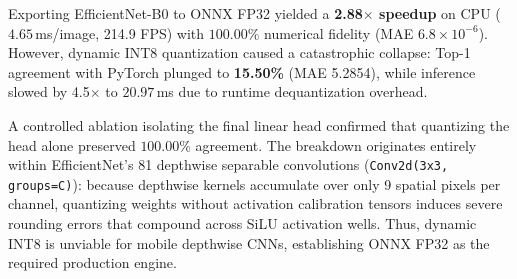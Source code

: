 \documentclass[conference]{IEEEtran}
\begin{document}
Exporting EfficientNet-B0 to ONNX FP32 yielded a \textbf{2.88$\times$ speedup} on CPU ($4.65$\,ms/image, 214.9 FPS) with $100.00\%$ numerical fidelity (MAE $6.8 \times 10^{-6}$). However, dynamic INT8 quantization caused a catastrophic collapse: Top-1 agreement with PyTorch plunged to \textbf{15.50\%} (MAE 5.2854), while inference slowed by 4.5$\times$ to $20.97$\,ms due to runtime dequantization overhead.

A controlled ablation isolating the final linear head confirmed that quantizing the head alone preserved $100.00\%$ agreement. The breakdown originates entirely within EfficientNet's 81 depthwise separable convolutions (\texttt{Conv2d(3x3, groups=C)}): because depthwise kernels accumulate over only 9 spatial pixels per channel, quantizing weights without activation calibration tensors induces severe rounding errors that compound across SiLU activation wells. Thus, dynamic INT8 is unviable for mobile depthwise CNNs, establishing ONNX FP32 as the required production engine.
\end{document}
